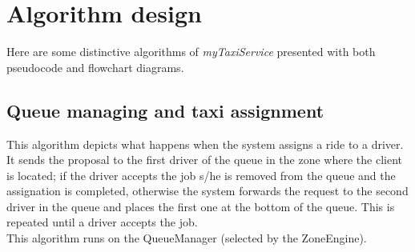 \documentclass[a4paper,11pt]{report} %
\newcommand{\mts}{\mbox{\normalfont\itshape myTaxiService}}
\begin{document}
	\section{Algorithm design}
	Here are some distinctive algorithms of \mts{} presented with both pseudocode and flowchart diagrams.
	\subsection{Queue managing and taxi assignment}
	This algorithm depicts what happens when the system assigns a ride to a driver. It sends the proposal to the first driver of the queue in the zone where the client is located; if the driver accepts the job s/he is removed from the queue and the assignation is completed, otherwise the system forwards the request to the second driver in the queue and places the first one at the bottom of the queue. This is repeated until a driver accepts the job. \\
	This algorithm runs on the QueueManager (selected by the ZoneEngine).\\
	
\end{document}
